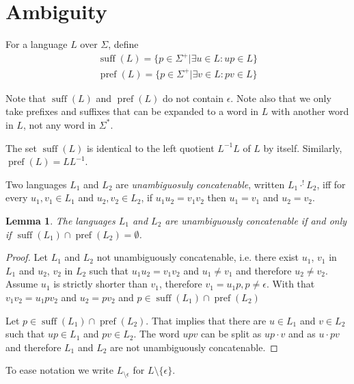 \documentclass{amsart}
\newcommand{\ensmath}[1]{\ensuremath{#1}\xspace}
\newcommand{\suff}{\ensmath{\operatorname{suff}}}
\newcommand{\pref}{\ensmath{\operatorname{pref}}}
\newcommand{\eps}{\ensmath{\epsilon}}
\newcommand{\conc}[2]{\ensmath{#1\cdot #2}}
\newcommand{\uaconc}[2]{\ensmath{#1\cdot^{!} #2}}
\newcommand{\noeps}[1]{\ensmath{{#1}_{\setminus \epsilon}}}
\newtheorem{lemma}[theorem]{Lemma}
{\theoremstyle{definition}
  \newtheorem{defn}{Definition}
  \newtheorem*{remark}{Remark}
  \newtheorem*{example}{Example}}
\begin{document}
\section*{Ambiguity}

\begin{defn}
  For a language $L$ over $\Sigma$, define
  \begin{equation*}
    \begin{split}
      \suff(L) = \{ p \in \Sigma^+ | \exists u \in L: up \in L \}\\
      \pref(L) = \{ p \in \Sigma^+ | \exists v \in L: pv \in L \}
    \end{split}
  \end{equation*}
\end{defn}
Note that $\suff(L)$ and $\pref(L)$ do not contain $\eps$. Note also that
we only take prefixes and suffixes that can be expanded to a word in $L$
with another word in $L$, not any word in $\Sigma^*$.

The set $\suff(L)$ is identical to the left quotient $L^{-1}L$ of $L$ by
itself. Similarly, $\pref(L) = LL^{-1}$.

\begin{defn}
Two languages $L_1$ and $L_2$ are \emph{unambiguosuly concatenable},
written \uaconc{L_1}{L_2}, iff for every $u_1, v_1 \in L_1$ and $u_2, v_2
\in L_2$, if $u_1u_2=v_1v_2$ then $u_1=v_1$ and $u_2=v_2$.
\end{defn}

\begin{lemma}
  The languages $L_1$ and $L_2$ are unambiguously concatenable if and only
  if $\suff(L_1) \cap \pref(L_2) = \emptyset$.
\end{lemma}
\begin{proof}
Let $L_1$ and $L_2$ not unambiguously concatenable, i.e. there exist $u_1$,
$v_1$ in $L_1$ and $u_2$, $v_2$ in $L_2$ such that $u_1u_2=v_1v_2$ and
$u_1\neq v_1$ and therefore $u_2 \neq v_2$. Assume $u_1$ is strictly
shorter than $v_1$, therefore $v_1 = u_1 p, p \neq \eps$. With that $v_1v_2
= u_1pv_2$ and $u_2 = pv_2$ and $p \in \suff(L_1) \cap \pref(L_2)$

Let $p \in \suff(L_1) \cap \pref(L_2)$. That implies that
there are $u\in L_1$ and $v\in L_2$ such that $up\in L_1$ and $pv\in
L_2$. The word $upv$ can be split as $\conc{up}{v}$ and as $\conc{u}{pv}$
and therefore $L_1$ and $L_2$ are not unambiguously concatenable.
\end{proof}

To ease notation we write $\noeps{L}$ for $L\setminus \{
\epsilon \}$.
\end{document}
